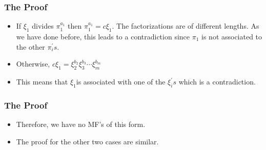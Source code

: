 \begin{frame}
  \frametitle{The Proof}
  \begin{itemize}
    \item If $\xi_{1}$ divides $\pi_{1}^{a_{1}}$ then $\pi_{1}^{a_{1}}=c\xi_{1}$.
      The factorizations are of different lengths. As we have done before,
      this leads to a contradiction since $\pi_{1}$ is not associated to
      the other $\pi_{i}^{'}s$. 
  \end{itemize}

  \pause{}
  \begin{itemize}
    \item Otherwise, $c\xi_{1}=\xi_{2}^{b_{2}}\xi_{3}^{b_{3}}\cdots\xi_{m}^{b_{m}}$
  \end{itemize}

  \pause{}
  \begin{itemize}
    \item This means that $\xi_{1}$is associated with one of the $\xi_{i}^{'}s$
      which is a contradiction.
  \end{itemize}
\end{frame}

\begin{frame}
  \frametitle{The Proof}
  \begin{itemize}
    \item Therefore, we have no MF's of this form.
  \end{itemize}

  \pause{}
  \begin{itemize}
    \item The proof for the other two cases are similar. 
  \end{itemize}
\end{frame}
